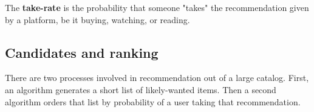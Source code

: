 \documentclass[titlepage, 12pt, leqno]{article}
\begin{document}
\begin{definition}
    The \textbf{take-rate} is the probability that someone "takes" the 
    recommendation given by a platform, be it buying, watching, or reading.
\end{definition}

\subsection{Candidates and ranking}
There are two processes involved in recommendation out of a large catalog. First,
an algorithm generates a short list of likely-wanted items. Then a second
algorithm orders that list by probability of a user taking that recommendation.
\end{document}
